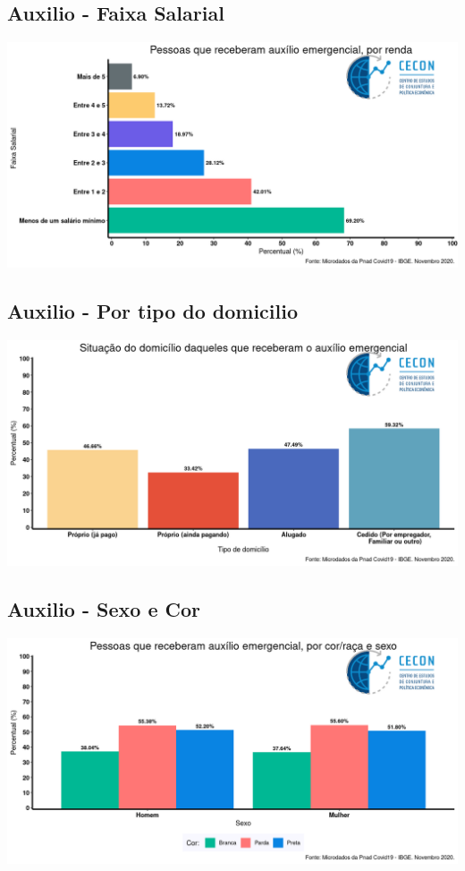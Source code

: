 \documentclass{SelfArx}
\begin{document}
\subsection*{Auxilio - Faixa Salarial}
\label{sec:org45ecad6}
\begin{center}
\includegraphics[width=.9\linewidth]{./figs/PNAD_COVID/auxilio_renda.png}
\end{center}
\subsection*{Auxilio - Por tipo do domicilio}
\label{sec:org16a23b9}
\begin{center}
\includegraphics[width=.9\linewidth]{./figs/PNAD_COVID/auxilio_domicilio.png}
\end{center}
\subsection*{Auxilio - Sexo e Cor}
\label{sec:org8624ee5}
\begin{center}
\includegraphics[width=.9\linewidth]{./figs/PNAD_COVID/auxilio_cor_sexo.png}
\end{center}
\end{document}
